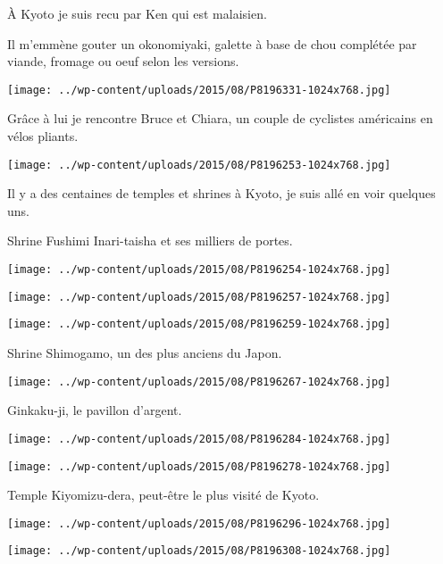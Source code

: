  \`A Kyoto je suis recu par Ken qui est malaisien. 

 Il m'emmène gouter un okonomiyaki, galette à base de chou complétée par viande, fromage ou oeuf selon les versions. 
\begin{center} \texttt{[image: ../wp-content/uploads/2015/08/P8196331-1024x768.jpg]} \end{center}

\pagebreak
 Grâce à lui je rencontre Bruce et Chiara, un couple de cyclistes américains en vélos pliants. 
\begin{center} \texttt{[image: ../wp-content/uploads/2015/08/P8196253-1024x768.jpg]} \end{center}

 Il y a des centaines de temples et shrines à Kyoto, je suis allé en voir quelques uns. 

 Shrine Fushimi Inari-taisha et ses milliers de portes.
\begin{center} \texttt{[image: ../wp-content/uploads/2015/08/P8196254-1024x768.jpg]} \end{center}
\begin{center} \texttt{[image: ../wp-content/uploads/2015/08/P8196257-1024x768.jpg]} \end{center}
\begin{center} \texttt{[image: ../wp-content/uploads/2015/08/P8196259-1024x768.jpg]} \end{center}

\pagebreak
 Shrine Shimogamo, un des plus anciens du Japon.
\begin{center} \texttt{[image: ../wp-content/uploads/2015/08/P8196267-1024x768.jpg]} \end{center}

 Ginkaku-ji, le pavillon d'argent.
\begin{center} \texttt{[image: ../wp-content/uploads/2015/08/P8196284-1024x768.jpg]} \end{center}
\begin{center} \texttt{[image: ../wp-content/uploads/2015/08/P8196278-1024x768.jpg]} \end{center}

 Temple Kiyomizu-dera, peut-être le plus visité de Kyoto.
\begin{center} \texttt{[image: ../wp-content/uploads/2015/08/P8196296-1024x768.jpg]} \end{center}
\begin{center} \texttt{[image: ../wp-content/uploads/2015/08/P8196308-1024x768.jpg]} \end{center}

